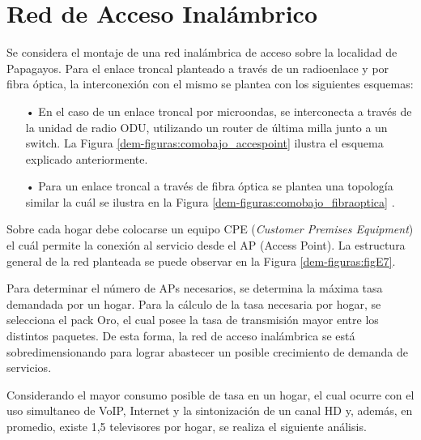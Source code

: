\section{Red de Acceso Inalámbrico}
Se considera el montaje de una red inalámbrica de acceso sobre la localidad de Papagayos. Para el enlace troncal planteado a través de un radioenlace  y por fibra óptica, la interconexión con el mismo se plantea con los siguientes esquemas:
\begin{enumerate}
\item[•]En el caso de un enlace troncal por microondas, se interconecta a través de la unidad de radio ODU, utilizando un router de última milla junto a un switch. La Figura \ref{dem-figuras:comobajo_accespoint} ilustra el esquema explicado anteriormente.



\item[•]Para un enlace troncal a través de fibra óptica se plantea una topología similar la cuál se ilustra en la Figura \ref{dem-figuras:comobajo_fibraoptica} .




\end{enumerate}


Sobre cada hogar debe colocarse un equipo CPE (\textit{Customer Premises Equipment}) el cuál permite la conexión al servicio desde el AP (Access Point). La estructura general de la red planteada se puede observar en la Figura \ref{dem-figuras:figE7}.


Para determinar el número de APs necesarios, se determina la máxima tasa demandada por un hogar.
Para la cálculo de la tasa necesaria por hogar, se selecciona el pack Oro, el cual posee la tasa de transmisión mayor entre los distintos paquetes. De esta forma, la red de acceso inalámbrica se está sobredimensionando para lograr abastecer un posible crecimiento de demanda de servicios.

Considerando el mayor consumo posible de tasa en un hogar, el cual ocurre con el uso simultaneo de VoIP, Internet y la sintonización de un canal HD y, además, en promedio, existe 1,5 televisores por hogar, se realiza el siguiente análisis.


